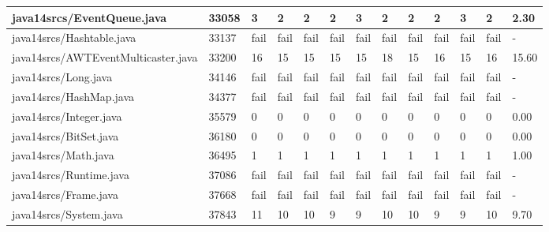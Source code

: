 \begin{tabular}{|l|l|l|l|l|l|l|l|l|l|l|l|l|}
\hline
java14srcs/EventQueue.java                         & 33058       & 3         & 2         & 2         & 2         & 3         & 2         & 2         & 2         & 3         & 2         & 2.30      \\
\hline
java14srcs/Hashtable.java                          & 33137       & fail      & fail      & fail      & fail      & fail      & fail      & fail      & fail      & fail      & fail      & -         \\
\hline
java14srcs/AWTEventMulticaster.java                & 33200       & 16        & 15        & 15        & 15        & 15        & 18        & 15        & 16        & 15        & 16        & 15.60     \\
\hline
java14srcs/Long.java                               & 34146       & fail      & fail      & fail      & fail      & fail      & fail      & fail      & fail      & fail      & fail      & -         \\
\hline
java14srcs/HashMap.java                            & 34377       & fail      & fail      & fail      & fail      & fail      & fail      & fail      & fail      & fail      & fail      & -         \\
\hline
java14srcs/Integer.java                            & 35579       & 0         & 0         & 0         & 0         & 0         & 0         & 0         & 0         & 0         & 0         & 0.00      \\
\hline
java14srcs/BitSet.java                             & 36180       & 0         & 0         & 0         & 0         & 0         & 0         & 0         & 0         & 0         & 0         & 0.00      \\
\hline
java14srcs/Math.java                               & 36495       & 1         & 1         & 1         & 1         & 1         & 1         & 1         & 1         & 1         & 1         & 1.00      \\
\hline
java14srcs/Runtime.java                            & 37086       & fail      & fail      & fail      & fail      & fail      & fail      & fail      & fail      & fail      & fail      & -         \\
\hline
java14srcs/Frame.java                              & 37668       & fail      & fail      & fail      & fail      & fail      & fail      & fail      & fail      & fail      & fail      & -         \\
\hline
java14srcs/System.java                             & 37843       & 11        & 10        & 10        & 9         & 9         & 10        & 10        & 9         & 9         & 10        & 9.70      \\

\end{tabular}
